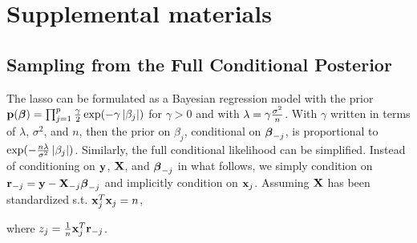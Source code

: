 \section*{Supplemental materials}

\begin{appendices}
\renewcommand{\thesection}{\Alph{section}}
\renewcommand{\thefigure}{\Alph{figure}}

\section{Sampling from the Full Conditional Posterior}
\label{Sup:A}


The lasso can be formulated as a Bayesian regression model with the prior $\mathbf{p}(\boldsymbol{\beta}) = \prod_{j = 1}^{p} \frac{\gamma}{2}\exp(-\gamma \left\lvert\beta_j\right\rvert)$ for $\gamma > 0$ and with $\lambda = \gamma \frac{\sigma^2}{n}$. With $\gamma$ written in terms of $\lambda$, $\sigma^2$, and $n$, then the prior on $\beta_j$, conditional on $\boldsymbol{\beta}_{-j}$, is proportional to $\exp(-\frac{n \lambda} {\sigma^2} \left\lvert\beta_j\right\rvert)$. Similarly, the full conditional likelihood can be simplified. Instead of conditioning on $\mathbf{y}$, $\mathbf{X}$, and $\boldsymbol{\beta}_{-j}$ in what follows, we simply condition on $\mathbf{r}_{-j} = \mathbf{y} - \mathbf{X}_{-j}\boldsymbol{\beta}_{-j}$ and implicitly condition on $\mathbf{x}_j$. Assuming $\mathbf{X}$ has been standardized s.t. $\mathbf{x}_j^T\mathbf{x}_j = n$,


where $z_{j} = \frac{1}{n} \mathbf{x}_{j}^{T}\mathbf{r}_{-j}$.


\end{appendices}
